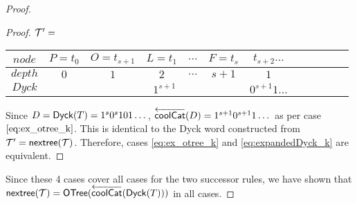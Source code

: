 \begin{proof}
\begin{proof}
    \noindent $\mathcal{T}'=$
    \begin{center}
	\begin{tabular}{ |c|c|c|c|c|c|c|c|c|c|c|c| } 
	    \hline

	    $node$ & $P=t_0$ & $O=t_{s+1}$& $L=t_1$ & $\dots$ & $F=t_s$  & $t_{s+2}\dots$ \\
	    \hline
	    $depth$ & $0$ & $1$ & $2$ & $\dots$ & $s+1$ & $1$  \\
	    \hline
	    $Dyck$ &  &  \multicolumn{4}{|c|}{$1^{s+1}$} &  $0^{s+1}1\dots$   \\
	    \hline
	\end{tabular}
    \end{center}

    Since $D=\mathsf{Dyck}{(T)}=1^s0^s101\dots$, $\overleftarrow{\mathsf{coolCat}}{(D)}=1^{s+1}0^{s+1}1\dots$ as per case $\ref{eq:ex_otree_k}$.  This is identical to the Dyck word constructed from $\mathcal{T}'=\mathsf{nextree}{(\mathcal{T})}$.  Therefore, cases \ref{eq:ex_otree_k} and \ref{eq:expandedDyck_k} are equivalent.

\end{proof}

Since these 4 cases cover all cases for the two successor rules, we have shown that $\mathsf{nextree}{(\mathcal{T})}=\mathsf{OTree}{(\overleftarrow{\mathsf{coolCat}}{(\mathsf{Dyck}{(T)})})}$ in all cases. 
\end{proof}

